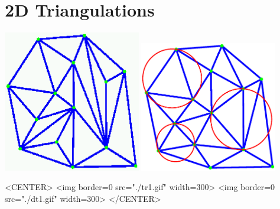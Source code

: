 \newcommand{\triangulationcomment}[1]{}

\chapter{2D Triangulations} 
\label{Chapter_2D_Triangulations}
\label{user_chapter_2D_Triangulations}
\minitoc

\begin{ccTexOnly}
\begin{center}
\includegraphics[width=6cm]{tr1.ps} \hspace*{1cm} 
\includegraphics[width=6cm]{dt1.ps} 
\end{center}
\end{ccTexOnly}
\begin{ccHtmlOnly}
<CENTER>
<img border=0 src="./tr1.gif" width=300>
<img border=0 src="./dt1.gif" width=300>
</CENTER>
\end{ccHtmlOnly}

